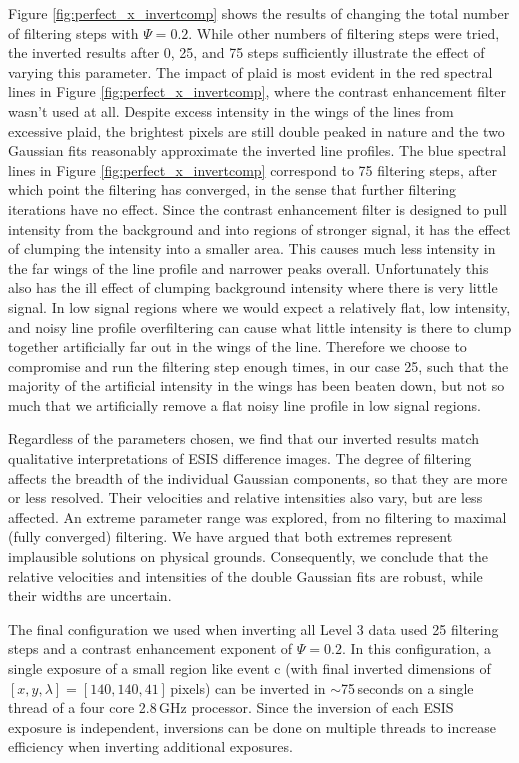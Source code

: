 \documentclass[linenumbers,trackchanges]{aastex63}
\begin{document}
Figure \ref{fig:perfect_x_invertcomp} shows the results of changing the total number of filtering steps with $\Psi=0.2$.
While other numbers of filtering steps were tried, the inverted results after 0, 25, and 75 steps sufficiently illustrate the effect of varying this parameter. 
The impact of plaid is most evident in the red spectral lines in Figure \ref{fig:perfect_x_invertcomp}, where the contrast enhancement filter wasn't used at all.
Despite excess intensity in the wings of the lines from excessive plaid, the brightest pixels are still double peaked in nature and the two Gaussian fits reasonably approximate the inverted line profiles.
The blue spectral lines in Figure \ref{fig:perfect_x_invertcomp} correspond to 75 filtering steps, after which point the filtering has converged, in the sense that further filtering iterations have no effect.
Since the contrast enhancement filter is designed to pull intensity from the background and into regions of stronger signal, it has the effect of clumping the intensity into a smaller area.
This causes much less intensity in the far wings of the line profile and narrower peaks overall.  
Unfortunately this also has the ill effect of clumping background intensity where there is very little signal.
In low signal regions where we would expect a relatively flat, low intensity, and noisy line profile overfiltering can cause what little intensity is there to clump together artificially far out in the wings of the line.
Therefore we choose to compromise and run the filtering step enough times, in our case 25, such that the majority of the artificial intensity in the wings has been beaten down, but not so much that we artificially remove a flat noisy line profile in low signal regions. 

Regardless of the parameters chosen, we find that our inverted results match qualitative interpretations of ESIS difference images.
The degree of filtering affects the breadth of the individual Gaussian components, so that they are more or less resolved. 
Their velocities and relative intensities also vary, but are less affected. 
An extreme parameter range was explored, from no filtering to maximal (fully converged) filtering. 
We have argued that both extremes represent implausible solutions on physical grounds. Consequently, we conclude that the relative velocities and intensities of the double Gaussian fits are robust, while their widths are uncertain. 

The final configuration we used when inverting all Level 3 data used 25 filtering steps and a contrast enhancement exponent of $\Psi=0.2$.
In this configuration, a single exposure of a small region like event c (with final inverted dimensions of $[x,y,\lambda] = [140,140,41]$\,pixels) can be inverted in $\sim$75\,seconds on a single thread of a four core 2.8\,GHz processor.
Since the inversion of each ESIS exposure is independent, inversions can be done on multiple threads to increase efficiency when inverting additional exposures. 	
	
	
\end{document}
